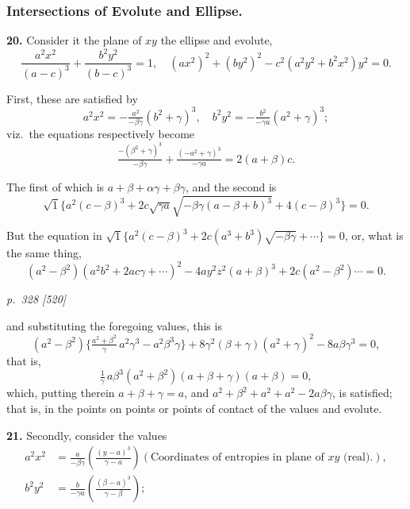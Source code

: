 \documentclass[11pt,a4paper]{book}
\begin{document}
\subsubsection*{Intersections of Evolute and Ellipse.}

\textbf{20.} Consider it the plane of $xy$ the ellipse and evolute,
\[
\frac{a^2 x^2}{(a - c)^3} + \frac{b^2 y^2}{(b - c)^3} = 1,\quad (a x^2)^2 + (b y^2)^2 - c^2(a^2 y^2 + b^2 x^2) y^2 = 0.
\]

First, these are satisfied by
\[
a^2 x^2 = -\tfrac{a^2}{-\beta\gamma}(b^2 + \gamma)^3,\quad
b^2 y^2 = -\tfrac{b^2}{-\gamma a}(a^2 + \gamma)^3;
\]
viz.\ the equations respectively become
\[
\tfrac{-(\beta^2 + \gamma)^3}{-\beta\gamma} + \tfrac{(-a^2 + \gamma)^3}{-\gamma a} = 2(a + \beta)c.
\]

The first of which is $a + \beta + \alpha\gamma + \beta\gamma$, and the second is
\[
\sqrt{1}\{a^2(c - \beta)^3 + 2c\sqrt{\gamma a}\sqrt{-\beta\gamma(a - \beta + b)^3} + 4(c - \beta)^3\} = 0.
\]

But the equation in $\sqrt{1}\{a^2(c - \beta)^3 + 2c(a^3 + b^3)\sqrt{-\beta\gamma} + \cdots\} = 0$,
or, what is the same thing,
\[
(a^2 - \beta^2)(a^2 b^2 + 2a c \gamma + \cdots)^2 - 4ay^2 z^2(a + \beta)^3 + 2c(a^2 - \beta^2)\cdots = 0.
\]

\clearpage

\bigskip
\textit{p.~328 [520]}
\smallskip

and substituting the foregoing values, this is
\[
(a^2 - \beta^2)\{\tfrac{a^2 + \beta^2}{\gamma}\,a^2\gamma^3 - a^2 \beta^3\gamma\} + 8\gamma^2(\beta + \gamma)(a^2 + \gamma)^2 - 8a\beta\gamma^3 = 0,
\]
that is,
\[
\tfrac{1}{\gamma}\,a\beta^3(a^2 + \beta^2)(a + \beta + \gamma)(a + \beta) = 0,
\]
which, putting therein $a + \beta + \gamma = a$, and $a^2 + \beta^2 + a^2 + a^2 - 2a\beta\gamma$, is satisfied; that is, in the points on points or points of contact of the values and evolute.

\textbf{21.} Secondly, consider the values
\begin{align*}
a^2 x^2 &= \tfrac{a}{-\beta\gamma}\!\left(\tfrac{(y - a)^3}{\gamma - a}\right) (\text{Coordinates of entropies in plane of $xy$ (real).}),\\
b^2 y^2 &= \tfrac{b}{-\gamma a}\!\left(\tfrac{(\beta - a)^3}{\gamma - \beta}\right);
\end{align*}
\end{document}
